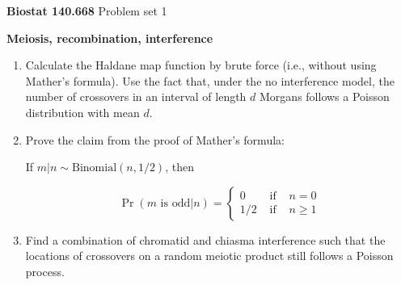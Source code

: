 \documentclass[12pt]{article}
\begin{document}
\noindent \textbf{Biostat 140.668} \hfill Problem set 1

\bigskip 

\noindent \textbf{Meiosis, recombination, interference}

\begin{enumerate}

\item Calculate the Haldane map function by brute force (i.e., without
using Mather's formula).  Use the fact that, under the no interference
model, the number of crossovers in an interval of length $d$ Morgans
follows a Poisson distribution with mean $d$.

\item Prove the claim from the proof of Mather's formula:

    If $m|n \sim \text{Binomial}(n, 1/2)$, then

    $$\Pr(\text{$m$ is odd} | n) = \left\{ \begin{array}{ccc}
0 & \text{ if } & n = 0 \\
1/2 & \text{ if } & n \ge 1 \end{array} \right. $$


\item Find a combination of chromatid and chiasma interference such
that the locations of crossovers on a random meiotic product still
follows a Poisson process.  

\end{enumerate}
\end{document}

